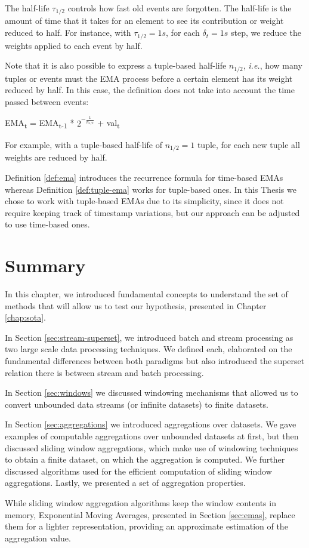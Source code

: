 The half-life $\tau_{1/2}$ controls how fast old events are forgotten. The half-life is the amount of time that it takes for an element to see its contribution or weight reduced to half. For instance, with $\tau_{1/2} = 1s$, for each $\delta_t = 1s$ step, we reduce the weights applied to each event by half. 

Note that it is also possible to express a tuple-based half-life $n_{1/2}$, \textit{i.e.}, how many tuples or events must the EMA process before a certain element has its weight reduced by half. In this case, the definition does not take into account the time passed between events:
\begin{definition}
EMA\textsubscript{t} = EMA\textsubscript{t-1} * $2^{-\frac{1}{n_{1/2}}}$ + val\textsubscript{t}
\label{def:tuple-ema}
\end{definition}
For example, with a tuple-based half-life of $n_{1/2}=1$ tuple, for each new tuple all weights are reduced by half.

Definition \ref{def:ema} introduces the recurrence formula for time-based EMAs whereas Definition \ref{def:tuple-ema} works for tuple-based ones. In this Thesis we chose to work with tuple-based EMAs due to its simplicity, since it does not require keeping track of timestamp variations, but our approach can be adjusted to use time-based ones.

\section{Summary}
In this chapter, we introduced fundamental concepts to understand the set of methods that will allow us to test our hypothesis, presented in Chapter \ref{chap:sota}.

In Section \ref{sec:stream-superset}, we introduced batch and stream processing as two large scale data processing techniques. We defined each, elaborated on the fundamental differences between both paradigms but also introduced the superset relation there is between stream and batch processing.

In Section \ref{sec:windows} we discussed windowing mechanisms that allowed us to convert unbounded data streams (or infinite datasets) to finite datasets.

In Section \ref{sec:aggregations} we introduced aggregations over datasets. We gave examples of computable aggregations over unbounded datasets at first, but then discussed sliding window aggregations, which make use of windowing techniques to obtain a finite dataset, on which the aggregation is computed. We further discussed algorithms used for the efficient computation of sliding window aggregations. Lastly, we presented a set of aggregation properties. 

While sliding window aggregation algorithms keep the window contents in memory, Exponential Moving Averages, presented in Section \ref{sec:emas}, replace them for a lighter representation, providing an approximate estimation of the aggregation value.